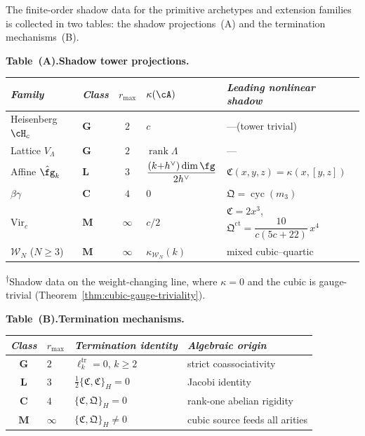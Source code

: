 \begin{example}
\label{ex:shadow-calibration-table}
The finite-order shadow data for the primitive archetypes and
extension families is collected in two tables: the shadow
projections~(A) and the termination mechanisms~(B).

\smallskip
\noindent
\textbf{Table~(A).\enspace Shadow tower projections.}
\nopagebreak
\begin{center}
\small
\renewcommand{\arraystretch}{1.35}
\begin{tabular}{@{}llcll@{}}
\toprule
\emph{Family}
  & \emph{Class} & $r_{\max}$ & $\kappa(\cA)$
  & \emph{Leading nonlinear shadow} \\
\midrule
Heisenberg $\cH_c$
  & $\mathbf{G}$ & $2$
  & $c$
  & ---\;(tower trivial) \\
Lattice $V_\Lambda$
  & $\mathbf{G}$ & $2$
  & $\operatorname{rank}\Lambda$
  & --- \\[4pt]
Affine $\hat{\fg}_k$
  & $\mathbf{L}$ & $3$
  & $\dfrac{(k{+}h^\vee)\dim\fg}{2h^\vee}$
  & $\mathfrak{C}(x,y,z) = \kappa(x,[y,z])$ \\[6pt]
$\beta\gamma$\rlap{\textsuperscript{$\dagger$}}
  & $\mathbf{C}$ & $4$
  & $0$
  & $\mathfrak{Q} = \operatorname{cyc}(m_3)$ \\[4pt]
$\mathrm{Vir}_c$
  & $\mathbf{M}$ & $\infty$
  & $c/2$
  & $\mathfrak{C} = 2x^3$,\;
    $\mathfrak{Q}^{\mathrm{ct}}
    = \dfrac{10}{c(5c{+}22)}\,x^4$ \\[6pt]
$\mathcal{W}_N$ ($N \geq 3$)
  & $\mathbf{M}$ & $\infty$
  & $\kappa_{\mathcal{W}_N}\!(k)$
  & mixed cubic--quartic \\
\bottomrule
\end{tabular}
\end{center}

\smallskip
\noindent
{\footnotesize \textsuperscript{$\dagger$}Shadow data on the
weight-changing line, where $\kappa = 0$ and the cubic is
gauge-trivial
(Theorem~\ref{thm:cubic-gauge-triviality}).}

\smallskip
\noindent
\textbf{Table~(B).\enspace Termination mechanisms.}
\nopagebreak
\begin{center}
\small
\renewcommand{\arraystretch}{1.15}
\begin{tabular}{@{}clll@{}}
\toprule
\emph{Class} & $r_{\max}$
  & \emph{Termination identity}
  & \emph{Algebraic origin} \\
\midrule
$\mathbf{G}$ & $2$
  & $\ell_k^{\mathrm{tr}} = 0$,\; $k \geq 2$
  & strict coassociativity \\
$\mathbf{L}$ & $3$
  & $\tfrac12\{\mathfrak{C},\mathfrak{C}\}_H = 0$
  & Jacobi identity \\
$\mathbf{C}$ & $4$
  & $\{\mathfrak{C},\mathfrak{Q}\}_H = 0$
  & rank-one abelian rigidity \\
$\mathbf{M}$ & $\infty$
  & $\{\mathfrak{C},\mathfrak{Q}\}_H \neq 0$
  & cubic source feeds all arities \\
\bottomrule
\end{tabular}
\end{center}


\end{example}
